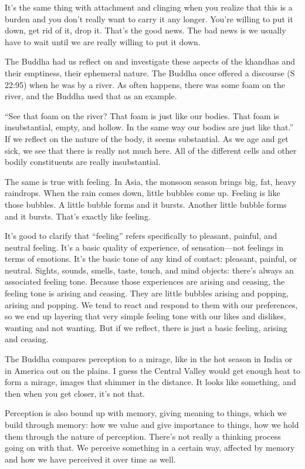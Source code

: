 It’s the same thing with attachment and clinging when you realize that
this is a burden and you don’t really want to carry it any longer.
You’re willing to put it down, get rid of it, drop it. That’s the good
news. The bad news is we usually have to wait until we are really
willing to put it down.

The Buddha had us reflect on and investigate these aspects of the
khandhas and their emptiness, their ephemeral nature. The Buddha once
offered a discourse (S 22:95) when he was by a river. As often happens,
there was some foam on the river, and the Buddha used that as an
example.

“See that foam on the river? That foam is just like our bodies. That
foam is insubstantial, empty, and hollow. In the same way our bodies are
just like that.” If we reflect on the nature of the body, it seems
substantial. As we age and get sick, we see that there is really not
much here. All of the different cells and other bodily constituents are
really insubstantial.

The same is true with feeling. In Asia, the monsoon season brings big,
fat, heavy raindrops. When the rain comes down, little bubbles come up.
Feeling is like those bubbles. A little bubble forms and it bursts.
Another little bubble forms and it bursts. That’s exactly like feeling.

It’s good to clarify that “feeling” refers specifically to pleasant,
painful, and neutral feeling. It’s a basic quality of experience, of
sensation—not feelings in terms of emotions. It’s the basic tone of any
kind of contact: pleasant, painful, or neutral. Sights, sounds, smells,
taste, touch, and mind objects: there’s always an associated feeling
tone. Because those experiences are arising and ceasing, the feeling
tone is arising and ceasing. They are little bubbles arising and
popping, arising and popping. We tend to react and respond to them with
our preferences, so we end up layering that very simple feeling tone
with our likes and dislikes, wanting and not wanting. But if we reflect,
there is just a basic feeling, arising and ceasing.

The Buddha compares perception to a mirage, like in the hot season in
India or in America out on the plains. I guess the Central Valley would
get enough heat to form a mirage, images that shimmer in the distance.
It looks like something, and then when you get closer, it’s not that.

Perception is also bound up with memory, giving meaning to things, which
we build through memory: how we value and give importance to things, how
we hold them through the nature of perception. There’s not really a
thinking process going on with that. We perceive something in a certain
way, affected by memory and how we have perceived it over time as well.

